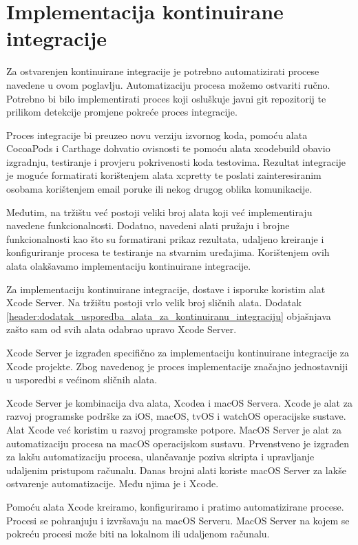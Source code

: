 \documentclass[times, utf8, diplomski, numeric]{fer}
\begin{document}
\section{Implementacija kontinuirane integracije} \label{XcodeServerCI}

Za ostvarenjen kontinuirane integracije je potrebno automatizirati procese navedene u ovom poglavlju. Automatizaciju procesa možemo ostvariti ručno. Potrebno bi bilo implementirati proces koji osluškuje javni git repozitorij te prilikom detekcije promjene pokreće proces integracije.

Proces integracije bi preuzeo novu verziju izvornog koda, pomoću alata CocoaPods i Carthage dohvatio ovisnosti te pomoću alata xcodebuild obavio izgradnju, testiranje i provjeru pokrivenosti koda testovima. Rezultat integracije je moguće formatirati korištenjem alata xcpretty te poslati zainteresiranim osobama korištenjem email poruke ili nekog drugog oblika komunikacije.

Međutim, na tržištu već postoji veliki broj alata koji već implementiraju navedene funkcionalnosti. Dodatno, navedeni alati pružaju i brojne funkcionalnosti kao što su formatirani prikaz rezultata, udaljeno kreiranje i konfiguriranje procesa te testiranje na stvarnim uređajima. Korištenjem ovih alata olakšavamo implementaciju kontinuirane integracije.

Za implementaciju kontinuirane integracije, dostave i isporuke koristim alat Xcode Server. Na tržištu postoji vrlo velik broj sličnih alata. Dodatak \ref{header:dodatak_usporedba_alata_za_kontinuiranu_integraciju} objašnjava zašto sam od svih alata odabrao upravo Xcode Server.

Xcode Server je izgrađen specifično za implementaciju kontinuirane integracije za Xcode projekte. Zbog navedenog je proces implementacije značajno jednostavniji u usporedbi s većinom sličnih alata.

Xcode Server je kombinacija dva alata, Xcodea i macOS Servera. Xcode je alat za razvoj programske podrške za iOS, macOS, tvOS i watchOS operacijske sustave. Alat Xcode već koristim u razvoj programske potpore. MacOS Server je alat za automatizaciju procesa na macOS operacijskom sustavu. Prvenstveno je izgrađen za lakšu automatizaciju procesa, ulančavanje poziva skripta i upravljanje udaljenim pristupom računalu. Danas brojni alati koriste macOS Server za lakše ostvarenje automatizacije. Među njima je i Xcode.

Pomoću alata Xcode kreiramo, konfiguriramo i pratimo automatizirane procese. Procesi se pohranjuju i izvršavaju na macOS Serveru. MacOS Server na kojem se pokreću procesi može biti na lokalnom ili udaljenom računalu.
\end{document}
